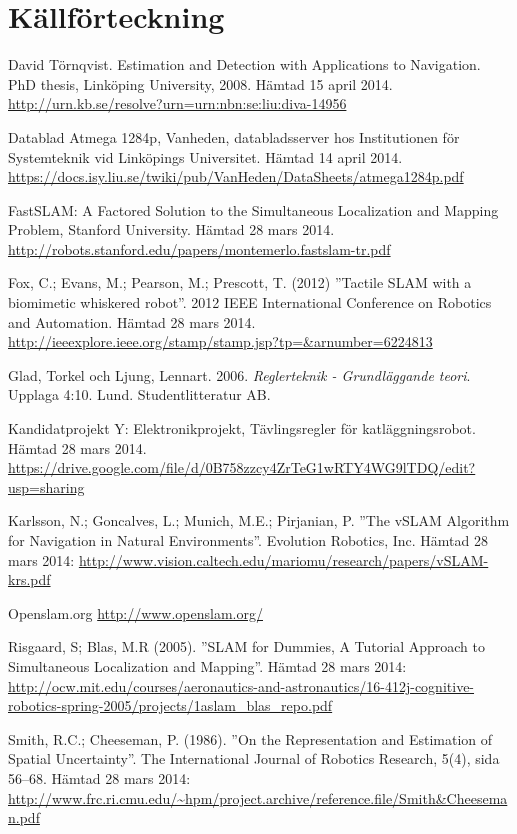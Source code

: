 \documentclass[a4paper,12pt,fleqn]{article}
\begin{document}
\newpage 
\section*{Källförteckning} 

David Törnqvist. Estimation and Detection with Applications to Navigation. PhD thesis, Linköping University, 2008. Hämtad 15 april 2014.
\url{http://urn.kb.se/resolve?urn=urn:nbn:se:liu:diva-14956}

Datablad Atmega 1284p, Vanheden, databladsserver hos Institutionen för Systemteknik vid Linköpings Universitet. Hämtad 14 april 2014. \url{https://docs.isy.liu.se/twiki/pub/VanHeden/DataSheets/atmega1284p.pdf}

FastSLAM: A Factored Solution to the Simultaneous
Localization and Mapping Problem, Stanford University. Hämtad 28 mars 2014.
\url{http://robots.stanford.edu/papers/montemerlo.fastslam-tr.pdf}

Fox, C.; Evans, M.; Pearson, M.; Prescott, T. (2012)
''Tactile SLAM with a biomimetic whiskered robot''. 2012 IEEE International Conference on Robotics and Automation. Hämtad 28 mars 2014.
\url{http://ieeexplore.ieee.org/stamp/stamp.jsp?tp=&arnumber=6224813}

Glad, Torkel och Ljung, Lennart. 2006. \textit{Reglerteknik - Grundläggande teori}. Upplaga 4:10. Lund. Studentlitteratur AB.

Kandidatprojekt Y: Elektronikprojekt, Tävlingsregler för katläggningsrobot. Hämtad 28 mars 2014.  \url{https://drive.google.com/file/d/0B758zzcy4ZrTeG1wRTY4WG9lTDQ/edit?usp=sharing}

Karlsson, N.; Goncalves, L.; Munich, M.E.; Pirjanian, P.
''The vSLAM Algorithm for Navigation in Natural Environments''. Evolution Robotics, Inc. Hämtad 28 mars 2014:
\url{http://www.vision.caltech.edu/mariomu/research/papers/vSLAM-krs.pdf}

Openslam.org
\url{http://www.openslam.org/}

Risgaard, S; Blas, M.R (2005).
''SLAM for Dummies, A Tutorial Approach to Simultaneous Localization and Mapping''. 
Hämtad 28 mars 2014:
\url{http://ocw.mit.edu/courses/aeronautics-and-astronautics/16-412j-cognitive-robotics-spring-2005/projects/1aslam_blas_repo.pdf}

Smith, R.C.; Cheeseman, P. (1986). ''On the Representation and Estimation of Spatial Uncertainty''. The
International Journal of Robotics Research, 5(4), sida 56–68. Hämtad
28 mars 2014:
\url{http://www.frc.ri.cmu.edu/~hpm/project.archive/reference.file/Smith&Cheeseman.pdf}
\end{document}

